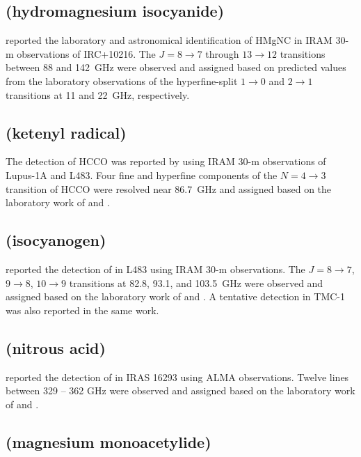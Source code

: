 \documentclass[twocolumn]{aastex631}
\newcommand{\update}[1]{{#1}}
\begin{document}
	\subsection{ (hydromagnesium isocyanide)}
	\label{HMgNC}
	
	\citet{Cabezas:2013bo} reported the laboratory and astronomical identification of HMgNC in IRAM 30-m observations of IRC+10216. The $J = 8\rightarrow7$ through $13\rightarrow12$ transitions between 88 and 142~GHz were observed and assigned based on predicted values from the laboratory observations of the hyperfine-split $1\rightarrow0$ and $2\rightarrow1$ transitions at 11 and 22~GHz, respectively.
	
	\subsection{ (ketenyl radical)}
	\label{HCCO}
	
	The detection of HCCO was reported by \citet{Agundez:2015di} using IRAM 30-m observations of Lupus-1A and L483.  Four fine and hyperfine components of the $N = 4\rightarrow3$ transition of HCCO were resolved near 86.7~GHz and assigned based on the laboratory work of \citet{Endo:1987bt} and \citet{Ohshima:1993kp}.
	
	
	\subsection{ (isocyanogen)}
	\label{CNCN}
	
	\citet{Agundez:2018tm} reported the detection of  in L483 using IRAM 30-m observations.  The $J = 8\rightarrow7$, $9\rightarrow8$, $10\rightarrow9$ transitions at 82.8, 93.1, and 103.5~GHz were observed and assigned based on the laboratory work of \citet{Winnewisser:1992ed} and \citet{Gerry:1990kj}.  A tentative detection in TMC-1 was also reported in the same work.
	
	\subsection{\update{ (nitrous acid)}}
	\label{HONO}
	
	\update{\citet{Coutens:2019cu} reported the detection of \ce{HONO} in IRAS 16293 using ALMA observations.  Twelve lines between 329 -- 362 GHz were observed and assigned based on the laboratory work of \citet{Guilmot:1993dw,Guilmot:1993wp} and \citet{DehayemKamadjeu:2005gr}.}
	
	\subsection{\update{ (magnesium monoacetylide)}}
    	\label{MgCCH}
    
\end{document}
